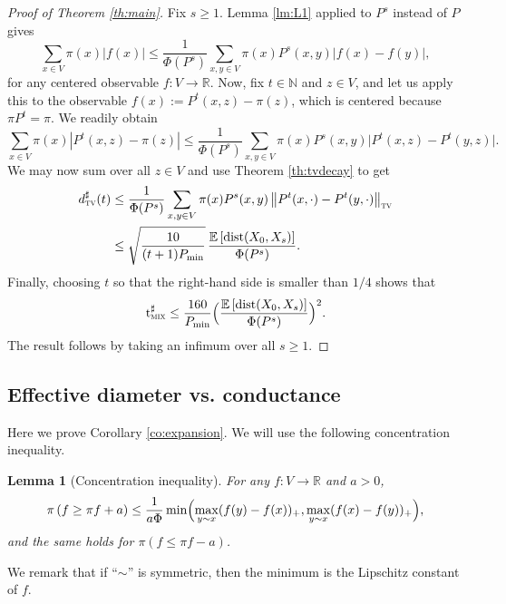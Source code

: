 \documentclass[10pt]{amsart}
\newtheorem{lemma}{Lemma}
\theoremstyle{definition}
\newcommand{\dN}{\mathbb {N}}
\newcommand{\dR}{\mathbb {R}}
\newcommand{\EE}{{\mathbb{E}}}
\newcommand{\dtv}{d_{\textup{\textsc{tv}}}}
\newcommand{\tmix}{\mathrm{t}_{\textup{\textsc{mix}}}}
\newcommand{\pmin}{P_{\mathrm{min}}}
\DeclareMathOperator{\dist}{dist}
\begin{document}
\begin{proof}[Proof of Theorem \ref{th:main}]Fix $s\ge 1$. Lemma \ref{lm:L1} applied to $P^s$ instead of $P$ gives
\begin{equation*}
\sum_{x\in V}\pi(x)\left|f(x)\right| \le \frac{1}{\Phi(P^s)}\sum_{x,y\in V}\pi(x)P^s(x,y)|f(x)-f(y)|,
\end{equation*}
for any centered observable $f\colon V\to\dR$. Now, fix $t\in\dN$ and $z\in V$, and let us apply this to the observable $f(x):=P^t(x,z)-\pi(z)$, which is centered because $\pi P^t=\pi$. We readily obtain
\begin{equation*}
\sum_{x\in V}\pi(x)\left|P^t(x,z)-\pi(z)\right| \le \frac{1}{\Phi(P^s)}\sum_{x,y\in V}\pi(x)P^s(x,y)\bigl|P^t(x,z)-P^t(y,z)\bigr|.
\end{equation*}
We may now sum over all $z\in V$ and use Theorem \ref{th:tvdecay} to get
\begin{align*}
\dtv^\sharp(t) & \le \frac{1}{\Phi(P^s)}\sum_{x,y\in V}\pi(x)P^s(x,y)\left\|P^t(x,\cdot)-P^t(y,\cdot)\right\|_{\textsc{tv}}\\
& \le \sqrt{\frac{10}{(t+1)\pmin}}\,\frac{\EE\left[\dist(X_0,X_s)\right]}{\Phi(P^s)}.
\end{align*}
Finally, choosing $t$ so that the right-hand side is smaller than $1/4$ shows that
\begin{equation*}
\tmix^\sharp \le \frac{160}{\pmin}\Bigl(\frac{\EE\left[\dist(X_0,X_s)\right]}{\Phi(P^s)} \Bigr)^2.
\end{equation*}
The result follows by taking an infimum over all $s\ge 1$.
\end{proof}

\subsection{Effective diameter vs. conductance}\label{sec:diameter}
Here we prove Corollary \ref{co:expansion}. We will use the following concentration inequality.
\begin{lemma}[Concentration inequality]\label{lm:concentration}For any $f\colon V\to\dR$ and $a>0$,
\begin{equation*}
\pi\left(f\ge \pi f+ a\right) \le \frac{1}{a\Phi}\min \Bigl(\max_{y\sim x}(f(y)-f(x))_+,\max_{y\sim x}(f(x)-f(y))_+ \Bigr),
\end{equation*}
and the same holds for $\pi(f\le \pi f- a)$.
\end{lemma}
We remark that if ``$\sim$'' is symmetric, then the minimum is the Lipschitz constant of $f$.
\end{document}
